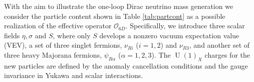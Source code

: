 \documentclass[12pt]{article}
\begin{document}
With the aim to illustrate the one-loop Dirac neutrino mass generation
we consider the particle content shown in Table \ref{tab:partcont} as
a possible realization of the effective operator $\mathcal{O}_{6D}$. Specifically, we introduce three scalar fields
$\eta, \sigma$ and $S$, where only $S$ develops a nonzero vacuum
expectation value (VEV),  a set of three singlet fermions,
$\nu_{Ri}$ ($i=1,2$) and $\nu_{R3}$, and another set of three heavy Majorana fermions, $\psi_{R\alpha}$ ($\alpha=1,2,3$).  
The $\operatorname{U}(1)_X$ charges for the new particles are defined by the anomaly cancellation conditions and the gauge invariance in Yukawa and scalar interactions.
\end{document}
